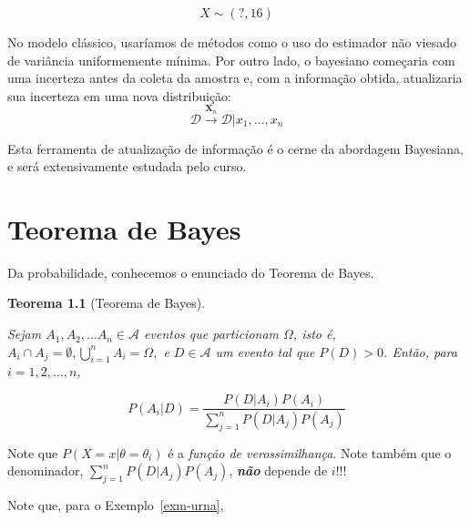 \documentclass[
  portuguese,
  letterpaper,
  DIV=11,
  numbers=noendperiod]{scrreport}
\theoremstyle{definition}
\theoremstyle{definition}
\theoremstyle{plain}
\newtheorem{theorem}{Teorema}[chapter]
\theoremstyle{remark}
\begin{document}
\[
X \sim (?,16)
\]

No modelo clássico, usaríamos de métodos como o uso do estimador não
viesado de variância uniformemente mínima. Por outro lado, o bayesiano
começaria com uma incerteza antes da coleta da amostra e, com a
informação obtida, atualizaria sua incerteza em uma nova distribuição:
\[
\mathcal{D} \stackrel{\boldsymbol{X}_n}{\rightarrow} \mathcal{D} \lvert x_1,
\dots, x_n
\]

Esta ferramenta de atualização de informação é o cerne da abordagem
Bayesiana, e será extensivamente estudada pelo curso.

\chapter{Teorema de Bayes}\label{teorema-de-bayes}

Da probabilidade, conhecemos o enunciado do Teorema de Bayes.

\begin{theorem}[Teorema de
Bayes]\protect\hypertarget{thm-bayes}{}\label{thm-bayes}

Sejam \(A_1, A_2, ... A_n \in \mathcal{A}\) eventos que particionam
\(\Omega\), isto é,
\(A_i \cap A_j = \emptyset, \bigcup_{i=1}^n A_i = \Omega,\) e \(D \in
\mathcal{A}\) um evento tal que \(P(D) > 0\). Então, para
\(i = 1, 2, \dots, n\),

\[
P(A_i \rvert D) = \frac{P(D \rvert A_i) P(A_i)}{\sum\limits^{n}_{j = 1} P(D \rvert
A_j)P(A_j)}
\]

\end{theorem}

\begin{tcolorbox}[enhanced jigsaw, opacityback=0, colframe=quarto-callout-note-color-frame, bottomrule=.15mm, bottomtitle=1mm, breakable, coltitle=black, opacitybacktitle=0.6, left=2mm, colback=white, rightrule=.15mm, titlerule=0mm, toptitle=1mm, title=\textcolor{quarto-callout-note-color}{\faInfo}\hspace{0.5em}{Detalhes importantes}, arc=.35mm, toprule=.15mm, leftrule=.75mm, colbacktitle=quarto-callout-note-color!10!white]

Note que \(P(X=x \rvert \theta = \theta_i)\) é a \emph{função de
verossimilhança}. Note também que o denominador,
\(\sum\limits^{n}_{j = 1} P(D \rvert A_j)P(A_j)\), \textbf{\emph{não}}
depende de \(i\)!!!

\end{tcolorbox}

Note que, para o Exemplo~\ref{exm-urna},
\end{document}
